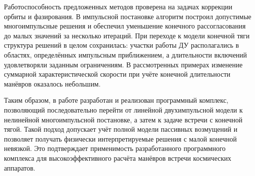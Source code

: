 Работоспособность предложенных методов проверена на задачах коррекции орбиты и фазирования. В импульсной постановке алгоритм построил допустимые многоимпульсные решения и обеспечил уменьшение конечного рассогласования до малых значений за несколько итераций. При переходе к модели конечной тяги структура решений в целом сохранилась: участки работы ДУ располагались в областях, определённых импульсным приближением, а длительности включений удовлетворяли заданным ограничениям. В рассмотренных примерах изменение суммарной характеристической скорости при учёте конечной длительности манёвров оказалось небольшим.

Таким образом, в работе разработан и реализован программный комплекс, позволяющий последовательно перейти от линейной двухимпульсной модели к нелинейной многоимпульсной постановке, а затем к задаче встречи с конечной тягой. Такой подход допускает учёт полной модели пассивных возмущений и позволяет получать физически интерпретируемые решения с малой конечной невязкой. Это подтверждает применимость разработанного программного комплекса для высокоэффективного расчёта манёвров встречи космических аппаратов.
